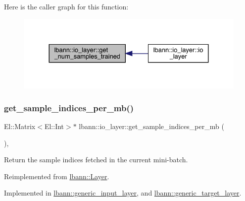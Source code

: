 Here is the caller graph for this function\+:\nopagebreak
\begin{figure}[H]
\begin{center}
\leavevmode
\includegraphics[width=330pt]{classlbann_1_1io__layer_ad25bf7559a27065c39d0c1d2f849347f_icgraph}
\end{center}
\end{figure}
\mbox{\label{classlbann_1_1io__layer_ab319ad5697e002072ee03e8c64523fb5}} 
\subsubsection{\texorpdfstring{get\+\_\+sample\+\_\+indices\+\_\+per\+\_\+mb()}{get\_sample\_indices\_per\_mb()}}
{\footnotesize\ttfamily El\+::\+Matrix$<$El\+::\+Int$>$$\ast$ lbann\+::io\+\_\+layer\+::get\+\_\+sample\+\_\+indices\+\_\+per\+\_\+mb (\begin{DoxyParamCaption}{ }\end{DoxyParamCaption})\hspace{0.3cm}{\ttfamily [override]}, {}}

Return the sample indices fetched in the current mini-\/batch. 

Reimplemented from \hyperlink{classlbann_1_1Layer_a0ac13af6f5ee8316d64c550bef919ee0}{lbann\+::\+Layer}.



Implemented in \hyperlink{classlbann_1_1generic__input__layer_a749741781204b17c8ca172a9a405a90e}{lbann\+::generic\+\_\+input\+\_\+layer}, and \hyperlink{classlbann_1_1generic__target__layer_a9673d3fb3db6ecaae979886178b785ea}{lbann\+::generic\+\_\+target\+\_\+layer}.


